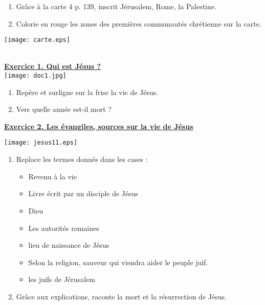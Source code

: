 \documentclass[12pt]{article}
\begin{document}
\vspace{1cm}
\begin{enumerate}
\item Grâce à la carte 4 p. 139, inscrit Jérusalem, Rome, la Palestine.
\item Colorie en rouge les zones des premières communautés chrétienne sur la carte.
\end{enumerate}

\texttt{[image: carte.eps]}

 \newpage
 
  \\
 
 \underline{\textbf{Exercice 1. Qui est Jésus ?}} \\
 
 \texttt{[image: doc1.jpg]}
 
\begin{enumerate}
\item Repère et surligne sur la frise la vie de Jésus. 
\item Vers quelle année est-il mort ? \\
\end{enumerate}

 \underline{\textbf{Exercice 2. Les évangiles, sources sur la vie de Jésus}}

\texttt{[image: jesus11.eps]} \\

\begin{enumerate}
\item Replace les termes donnés dans les cases : \\
\begin{minipage}{5cm}
\begin{itemize}
\item Revenu à la vie
\item Livre écrit par un disciple de Jésus
\item Dieu
\item Les autorités romaines
\end{itemize}
\end{minipage}
\begin{minipage}{5cm}
\begin{itemize}
\item lieu de naissance de Jésus
\item Selon la religion, sauveur qui viendra aider le peuple juif.
\item les juifs de Jérusalem \\
\end{itemize}
\end{minipage}

\item Grâce aux explications, raconte la mort et la résurrection de Jésus.
\end{enumerate}
\end{document}
